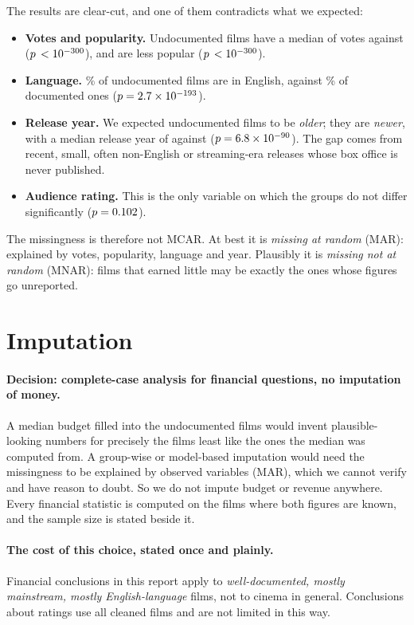 \documentclass[a4paper,12pt]{report}
\begin{document}
The results are clear-cut, and one of them contradicts what we expected:

\begin{itemize}
  \item \textbf{Votes and popularity.} Undocumented films have a median of \CleanMarMedianVotesUndoc{} votes against \CleanMarMedianVotesDoc{} ($p\,<10^{-300}$), and are less popular ($p\,<10^{-300}$).
  \item \textbf{Language.} \CleanMarPctEnglishUndoc\% of undocumented films are in English, against \CleanMarPctEnglishDoc\% of documented ones ($p=2.7\times10^{-193}$).
  \item \textbf{Release year.} We expected undocumented films to be \emph{older}; they are \emph{newer}, with a median release year of \CleanMarMedianYearUndoc{} against \CleanMarMedianYearDoc{} ($p=6.8\times10^{-90}$). The gap comes from recent, small, often non-English or streaming-era releases whose box office is never published.
  \item \textbf{Audience rating.} This is the only variable on which the groups do not differ significantly ($p=0.102$).
\end{itemize}

The missingness is therefore not MCAR. At best it is \emph{missing at random} (MAR): explained by votes, popularity, language and year. Plausibly it is \emph{missing not at random} (MNAR): films that earned little may be exactly the ones whose figures go unreported.

\section{Imputation}

\paragraph{Decision: complete-case analysis for financial questions, no imputation of money.} A median budget filled into the undocumented films would invent plausible-looking numbers for precisely the films least like the ones the median was computed from. A group-wise or model-based imputation would need the missingness to be explained by observed variables (MAR), which we cannot verify and have reason to doubt. So we do not impute budget or revenue anywhere. Every financial statistic is computed on the films where both figures are known, and the sample size is stated beside it.

\paragraph{The cost of this choice, stated once and plainly.} Financial conclusions in this report apply to \emph{well-documented, mostly mainstream, mostly English-language} films, not to cinema in general. Conclusions about ratings use all \CleanRowsOut{} cleaned films and are not limited in this way.
\end{document}
